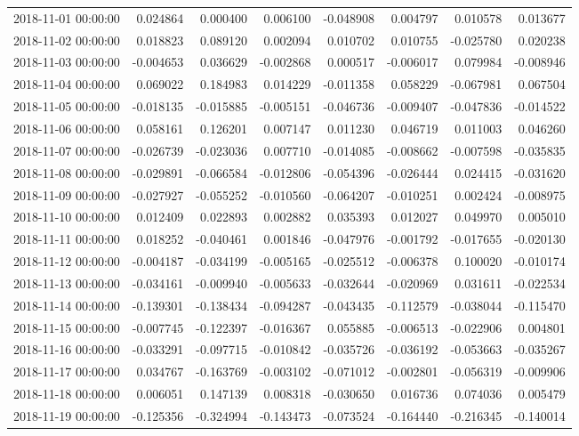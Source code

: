\begin{tabular}{lrrrrrrr}
2018-11-01 00:00:00 & 0.024864 & 0.000400 & 0.006100 & -0.048908 & 0.004797 & 0.010578 & 0.013677 \\
2018-11-02 00:00:00 & 0.018823 & 0.089120 & 0.002094 & 0.010702 & 0.010755 & -0.025780 & 0.020238 \\
2018-11-03 00:00:00 & -0.004653 & 0.036629 & -0.002868 & 0.000517 & -0.006017 & 0.079984 & -0.008946 \\
2018-11-04 00:00:00 & 0.069022 & 0.184983 & 0.014229 & -0.011358 & 0.058229 & -0.067981 & 0.067504 \\
2018-11-05 00:00:00 & -0.018135 & -0.015885 & -0.005151 & -0.046736 & -0.009407 & -0.047836 & -0.014522 \\
2018-11-06 00:00:00 & 0.058161 & 0.126201 & 0.007147 & 0.011230 & 0.046719 & 0.011003 & 0.046260 \\
2018-11-07 00:00:00 & -0.026739 & -0.023036 & 0.007710 & -0.014085 & -0.008662 & -0.007598 & -0.035835 \\
2018-11-08 00:00:00 & -0.029891 & -0.066584 & -0.012806 & -0.054396 & -0.026444 & 0.024415 & -0.031620 \\
2018-11-09 00:00:00 & -0.027927 & -0.055252 & -0.010560 & -0.064207 & -0.010251 & 0.002424 & -0.008975 \\
2018-11-10 00:00:00 & 0.012409 & 0.022893 & 0.002882 & 0.035393 & 0.012027 & 0.049970 & 0.005010 \\
2018-11-11 00:00:00 & 0.018252 & -0.040461 & 0.001846 & -0.047976 & -0.001792 & -0.017655 & -0.020130 \\
2018-11-12 00:00:00 & -0.004187 & -0.034199 & -0.005165 & -0.025512 & -0.006378 & 0.100020 & -0.010174 \\
2018-11-13 00:00:00 & -0.034161 & -0.009940 & -0.005633 & -0.032644 & -0.020969 & 0.031611 & -0.022534 \\
2018-11-14 00:00:00 & -0.139301 & -0.138434 & -0.094287 & -0.043435 & -0.112579 & -0.038044 & -0.115470 \\
2018-11-15 00:00:00 & -0.007745 & -0.122397 & -0.016367 & 0.055885 & -0.006513 & -0.022906 & 0.004801 \\
2018-11-16 00:00:00 & -0.033291 & -0.097715 & -0.010842 & -0.035726 & -0.036192 & -0.053663 & -0.035267 \\
2018-11-17 00:00:00 & 0.034767 & -0.163769 & -0.003102 & -0.071012 & -0.002801 & -0.056319 & -0.009906 \\
2018-11-18 00:00:00 & 0.006051 & 0.147139 & 0.008318 & -0.030650 & 0.016736 & 0.074036 & 0.005479 \\
2018-11-19 00:00:00 & -0.125356 & -0.324994 & -0.143473 & -0.073524 & -0.164440 & -0.216345 & -0.140014 \\

\end{tabular}
